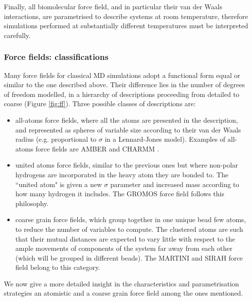Finally, all biomolecular force field, and in particular their van der Waals interactions, are parametrised to describe systems at room temperature, therefore simulations performed at substantially different temperatures must be interpreted carefully.


\subsubsection{Force fields: classifications}
Many force fields for classical MD simulations adopt a functional form equal or similar to the one described above. Their difference lies in the number of degrees of freedom modelled, in a hierarchy of descriptions proceeding from detailed to coarse  (Figure \ref{fig:ff}). Three possible classes of descriptions are:
\begin{itemize}
\item all-atoms force fields, where all the atoms are presented in the description, and represented as spheres of variable size according to their van der Waals radius (e.g. proportional to $\sigma$ in a Lennard-Jones model). Examples of all-atoms force fields are AMBER \cite{Maier2015} and CHARMM \cite{MacKerell1998,Klauda2010}.
\item united atoms force fields, similar to the previous ones but where non-polar hydrogens are incorporated in the heavy atom they are bonded to. The ``united atom" is given a new $\sigma$ parameter and increased mass according to how many hydrogen it includes. The GROMOS force field \cite{Oostenbrink2004,Schmid2011} follows this philosophy.
\item coarse grain force fields, which group together in one unique bead few atoms, to reduce the number of variables to compute. The clustered atoms are such that their mutual distances are expected to vary little with respect to the ample movements of components of the system far away from each other (which will be grouped in different beads). The MARTINI \cite{Marrink2007,Monticelli2008,DeJong2013} and SIRAH \cite{Machado2018,Barrera2019} force field belong to this category.
\end{itemize}
%
We now give a more detailed insight in the characteristics and parametrisation strategies an atomistic and a coarse grain force field among the ones mentioned.

